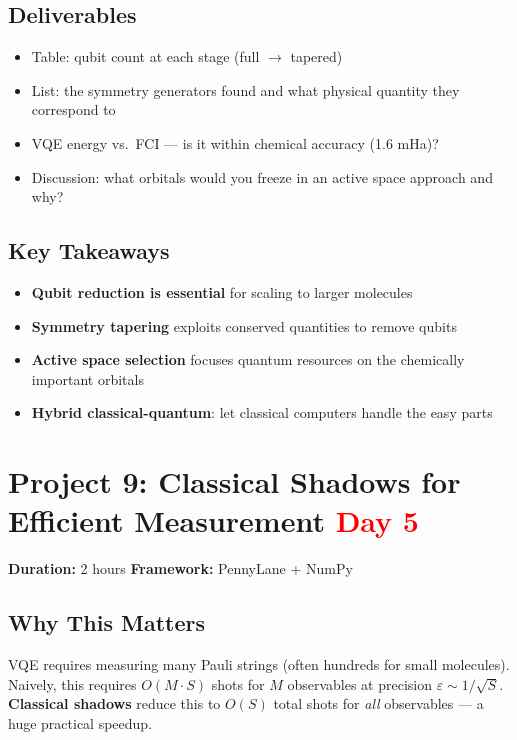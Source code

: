 \documentclass[11pt,a4paper]{article}
\begin{document}
\subsection*{Deliverables}
\begin{itemize}
    \item[\checkmark] Table: qubit count at each stage (full $\to$ tapered)
    \item[\checkmark] List: the symmetry generators found and what physical quantity they correspond to
    \item[\checkmark] VQE energy vs.\ FCI --- is it within chemical accuracy (1.6 mHa)?
    \item[\checkmark] Discussion: what orbitals would you freeze in an active space approach and why?
\end{itemize}

\subsection*{Key Takeaways}
\begin{itemize}
    \item \textbf{Qubit reduction is essential} for scaling to larger molecules
    \item \textbf{Symmetry tapering} exploits conserved quantities to remove qubits
    \item \textbf{Active space selection} focuses quantum resources on the chemically important orbitals
    \item \textbf{Hybrid classical-quantum}: let classical computers handle the easy parts
\end{itemize}


\section{Project 9: Classical Shadows for Efficient Measurement \hfill \textcolor{red}{\textbf{Day 5}}}

\begin{questionbox}
\textbf{Duration:} 2 hours \quad \textbf{Framework:} PennyLane + NumPy
\end{questionbox}

\subsection*{Why This Matters}
VQE requires measuring many Pauli strings (often hundreds for small molecules). Naively, this requires $O(M \cdot S)$ shots for $M$ observables at precision $\varepsilon \sim 1/\sqrt{S}$. \textbf{Classical shadows} reduce this to $O(S)$ total shots for \textit{all} observables --- a huge practical speedup.
\end{document}
